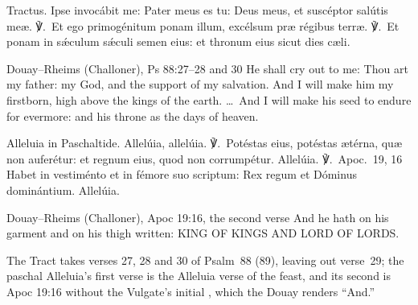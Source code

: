 \begin{latinproper}
\textnormal{Tractus.} Ipse invocábit me: Pater meus es tu: Deus meus, et
suscéptor salútis meæ. ℣.~Et ego primogénitum ponam illum, excélsum præ
régibus terræ. ℣.~Et ponam in sǽculum sǽculi semen eius: et thronum eius
sicut dies cæli.
\end{latinproper}

\begin{englishwitness}{Douay--Rheims (Challoner), Ps 88:27--28 and 30}
He shall cry out to me: Thou art my father: my God, and the support of my
salvation. And I will make him my firstborn, high above the kings of the
earth. \dots\ And I will make his seed to endure for evermore: and his throne
as the days of heaven.
\end{englishwitness}

\begin{latinproper}
\textnormal{Alleluia in Paschaltide.} Allelúia, allelúia. ℣.~Potéstas eius,
potéstas ætérna, quæ non auferétur: et regnum eius, quod non corrumpétur.
Allelúia. ℣.~\textnormal{Apoc.\ 19, 16} Habet in vestiménto et in fémore suo
scriptum: Rex regum et Dóminus dominántium. Allelúia.
\end{latinproper}

\begin{englishwitness}{Douay--Rheims (Challoner), Apoc 19:16, the second verse}
And he hath on his garment and on his thigh written: KING OF KINGS AND LORD OF
LORDS.
\end{englishwitness}

\noindent The Tract takes verses 27, 28 and 30 of Psalm~88 (89), leaving out
verse~29; the paschal Alleluia's first verse is the Alleluia verse of the
feast, and its second is Apoc 19:16 without the Vulgate's initial ,
which the Douay renders ``And.''
